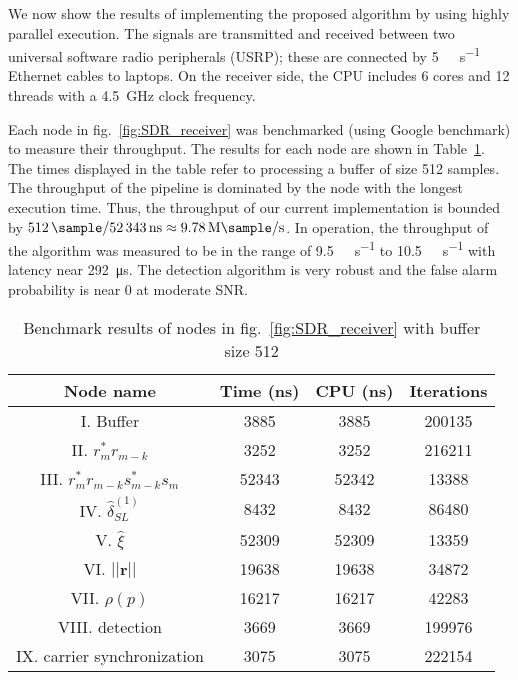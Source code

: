 We now show the results of implementing the proposed algorithm
by using
highly parallel execution.
The signals are transmitted and received between two universal software radio peripherals (USRP);
these are connected by \SI[per-mode=symbol]{5}{\giga\bits\per\second} Ethernet cables to
laptops.
On the receiver side, 
the CPU includes 6 cores and 12 threads with a \SI{4.5}{\giga\hertz}
clock frequency.

Each node in fig.~\ref{fig:SDR_receiver} was benchmarked (using Google benchmark) to measure their throughput.
The results for each node are shown 
in Table~\ref{table:BM_function_nodes}.
The times displayed in the table
refer to processing a  buffer of size 512 samples.
The throughput of the 
pipeline is dominated by the node with the longest execution time.
Thus, the  throughput of our current implementation is bounded by
$\SI{512}{\sample}/\SI{52343}{\nano\second}  \approx \SI[per-mode=symbol]{9.78}{\mega\sample\per\second}$.
In operation, the throughput of the algorithm was measured to be in
the range of
\SI[per-mode=symbol]{9.5}{\mega\sample\per\second} to \SI[per-mode=symbol]{10.5}{\mega\sample\per\second} with latency near \SI{292}{\micro\second}.
The detection algorithm is very robust and the false alarm probability is near 0 at moderate SNR.

\begin{table}[t]
    \caption{Benchmark results of nodes in fig.~\ref{fig:SDR_receiver} with buffer size 512}  %
    \centering %
    \begin{tabular}{c c c c} %
    \hline\hline %
    Node name & Time (ns) & CPU (ns) & Iterations \\ [0.5ex] %
    \hline %
    I. Buffer  & 3885 & 3885 & 200135 \\ %
    II. $r_m^*r_{m-k}$  & 3252 & 3252 & 216211 \\
    III. $r_m^*r_{m-k}s_{m-k}^*s_m$ & 52343 & 52342 & 13388 \\
    IV. $\hat{\delta}_{SL}^{(1)}$ & 8432 & 8432 & 86480 \\
    V. $\hat{\xi}$ & 52309 & 52309 & 13359 \\
    VI. $||\bm{r}||$ & 19638 & 19638 & 34872 \\ %
    VII. $\rho(p)$ & 16217 & 16217 & 42283 \\
    VIII. detection & 3669 & 3669 & 199976 \\
    IX. carrier synchronization & 3075 & 3075 & 222154  \\ [1ex]
    \hline
    \end{tabular}
    \label{table:BM_function_nodes} %
  \end{table}

